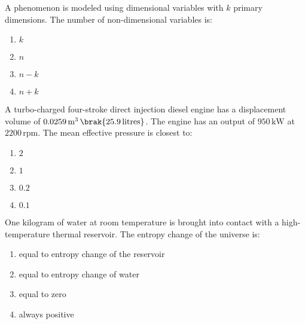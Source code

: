\iffalse
                       
                        
                        
                        
                    
                        \author{AI24BTECH11006 - Bugada Roopansha}
                        \section{ME}
                        \chapter{2010}
                        \fi

  
    \item A phenomenon is modeled using dimensional variables with $k$ primary dimensions. The number of non-dimensional variables is:
    \begin{enumerate}
        \item $k$
        \item $n$
        \item $n - k$
        \item $n + k$
    \end{enumerate}

    \item A turbo-charged four-stroke direct injection diesel engine has a displacement volume of $0.0259 \, \text{m}^3 \, \brak{25.9 \, \text{litres}}$. The engine has an output of $950 \, \text{kW}$ at $2200 \, \text{rpm}$. The mean effective pressure  is closest to:
    \begin{enumerate}
        \item $2$
        \item $1$
        \item $0.2$
        \item $0.1$
    \end{enumerate}

    \item One kilogram of water at room temperature is brought into contact with a high-temperature thermal reservoir. The entropy change of the universe is:
    \begin{enumerate}
        \item equal to entropy change of the reservoir
        \item equal to entropy change of water
        \item equal to zero
        \item always positive
    \end{enumerate}

